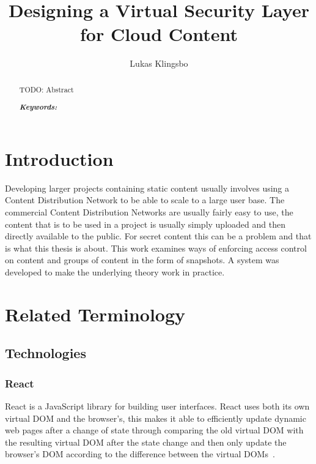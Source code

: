 \documentclass[a4paper,12pt]{article}
\title{\textbf{Designing a Virtual Security Layer for Cloud Content}}
\author{Lukas Klingsbo}
\providecommand{\keywords}[1]{\textbf{\textit{Keywords: }} #1}
\begin{document}
\maketitle
%

\setcounter{page}{2}

%
\begin{abstract}
    TODO: Abstract

\keywords{}
\end{abstract}

\newpage\null\thispagestyle{empty}\newpage

\setcounter{tocdepth}{3}
\tableofcontents

\clearpage
{}
\setcounter{page}{1}
\section{Introduction}
Developing larger projects containing static content usually involves using a Content Distribution Network 
to be able to scale to a large user base. The commercial Content Distribution Networks are usually fairly easy to use, 
the content that is to be used in a project is usually simply uploaded and then directly available to the public. 
For secret content this can be a problem and that is what this thesis is about. This work examines ways of enforcing 
access control on content and groups of content in the form of snapshots. A system was developed to make the underlying 
theory work in practice. 

\newpage
\section{Related Terminology}
\subsection{Technologies}
\subsubsection{React}
React is a JavaScript library for building user interfaces. React uses both its own virtual DOM and the browser's, 
this makes it able to efficiently update dynamic web pages after a change of state through comparing the old virtual 
DOM with the resulting virtual DOM after the state change and then only update the browser's DOM according to the 
difference between the virtual DOMs~\cite{REACT}.
\end{document}

